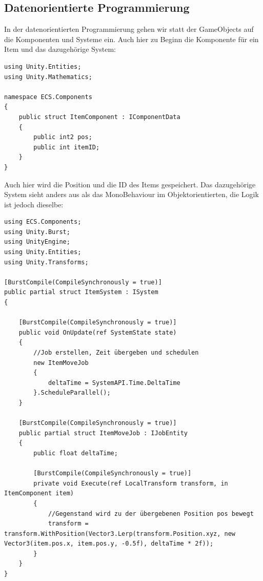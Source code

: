 \documentclass[12pt, titlepage]{article}
\DeclareRobustCommand{\#}{\adjustbox{valign=B,totalheight=.57\baselineskip}{\oldhash}}%
\begin{document}
\subsection{Datenorientierte Programmierung}
In der datenorientierten Programmierung gehen wir statt der GameObjects auf die Komponenten und Systeme ein. Auch hier zu Beginn die Komponente für ein Item und das dazugehörige System:
\begin{lstlisting}[style=code, caption={Item Komponente ECS}]
using Unity.Entities;
using Unity.Mathematics;

namespace ECS.Components
{
    public struct ItemComponent : IComponentData
    {
        public int2 pos;
        public int itemID;
    }
}
\end{lstlisting}
Auch hier wird die Position und die ID des Items gespeichert. Das dazugehörige System sieht anders aus als das MonoBehaviour im Objektorientierten, die Logik ist jedoch dieselbe:
\begin{lstlisting}[style=code, caption={Item System}]
using ECS.Components;
using Unity.Burst;
using UnityEngine;
using Unity.Entities;
using Unity.Transforms;

[BurstCompile(CompileSynchronously = true)]
public partial struct ItemSystem : ISystem
{
    
    [BurstCompile(CompileSynchronously = true)]
    public void OnUpdate(ref SystemState state)
    {
    	//Job erstellen, Zeit übergeben und schedulen
        new ItemMoveJob
        {
            deltaTime = SystemAPI.Time.DeltaTime
        }.ScheduleParallel();
    }

    [BurstCompile(CompileSynchronously = true)]
    public partial struct ItemMoveJob : IJobEntity
    {
        public float deltaTime;
        
        [BurstCompile(CompileSynchronously = true)]
        private void Execute(ref LocalTransform transform, in ItemComponent item)
        {
        	//Gegenstand wird zu der übergebenen Position pos bewegt
            transform = transform.WithPosition(Vector3.Lerp(transform.Position.xyz, new Vector3(item.pos.x, item.pos.y, -0.5f), deltaTime * 2f));
        }
    }
}
\end{lstlisting}
\end{document}
